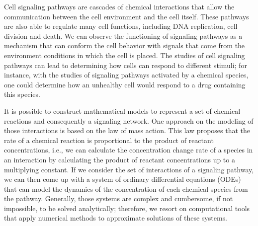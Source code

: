 




Cell signaling pathways are cascades of chemical interactions that 
allow the communication between the cell environment and the 
cell itself. These pathways are also able to regulate many cell 
functions, including DNA replication, cell division and death. We
can observe the functioning of signaling pathways as a mechanism that 
can conform the cell behavior with signals that come from the 
environment conditions in which the cell is placed. The studies of cell 
signaling pathways can lead to determining how cells can respond to 
different stimuli; for instance, with the studies of signaling pathways
activated by a chemical species, one could determine how an unhealthy 
cell would respond to a drug containing this species.

It is possible to construct mathematical models to represent a set of
chemical reactions and consequently a signaling network. One approach on 
the modeling of those interactions is based on the law of mass action. 
This law proposes that the rate of a chemical reaction is proportional 
to the product of reactant concentrations, i.e., we can calculate the 
concentration change rate of a species in an interaction by calculating 
the product of reactant concentrations up to a multiplying constant. 
If we consider the set of interactions of a signaling pathway, we can
then come up with a system of ordinary differential equations (ODEs) 
that can model the dynamics of the concentration of each chemical 
species from the pathway. Generally, those systems are complex and 
cumbersome, if not impossible, to be solved analytically; therefore, we 
resort on computational tools that apply numerical methods to 
approximate solutions of these systems.

